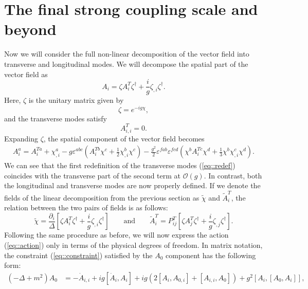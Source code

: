 \documentclass{article}
\begin{document}
\section{The final strong coupling scale and beyond}
Now we will consider the full non-linear decomposition of the vector field into transverse and longitudinal modes. We will decompose the spatial part of the vector field as 
\begin{equation}\label{eq::Nonlindec}
    A_i=\zeta A_i^T\zeta^{\dagger}+\frac{i}{g}\zeta_{,i}\zeta^{\dagger}.
\end{equation}
Here, $\zeta$ is the unitary matrix given by
\begin{equation}
    \zeta=e^{-ig\chi},
\end{equation}
and the transverse modes satisfy
\begin{equation}
    A_{i,i}^{T}=0.
\end{equation}
Expanding $\zeta$, the spatial component of the vector field becomes \begin{equation}\label{eq::Vainsh}
    \begin{split}
        A_i^a=A_i^{Ta}+\chi_{,i}^a-g\varepsilon^{abc}(A_i^{Tb}\chi^c+\frac{1}{2}\chi_{,i}^b\chi^c)-\frac{g^2}{2}\varepsilon^{fab}\varepsilon^{fcd}(\chi^bA_i^{Tc}\chi^d+\frac{1}{3}\chi^b\chi^c_{,i}\chi^d).
    \end{split}
\end{equation}
We can see that the first redefinition of the transverse modes (\ref{eq::redef}) coincides with the transverse part of the second term at $\mathcal{O}\left(g\right)$. In contrast, both the longitudinal and transverse modes are now properly defined. If we denote the fields of the linear decomposition from the previous section as $\tilde{\chi}$ and $\tilde{A}_i^T$, the relation between the two pairs of fields is as follows: 
\begin{equation}
    \tilde{\chi}=\frac{\partial_i}{\Delta}\left[\zeta A_i^T\zeta^{\dagger}+\frac{i}{g}\zeta_{,i}\zeta^{\dagger}\right]\qquad\text{and}\qquad \tilde{A}_i^T=P_{ij}^T\left[\zeta A_j^T\zeta^{\dagger}+\frac{i}{g}\zeta_{,j}\zeta^{\dagger}\right].
\end{equation}
Following the same procedure as before, we will now express the action (\ref{eq::action}) only in terms of the physical degrees of freedom. 
In matrix notation, the constraint (\ref{eq::constraint}) satisfied by the $A_0$ component has the following form: 
\begin{equation}\label{eq::constraint1}
    \begin{split}
        \left(-\Delta+m^2\right)A_0&=-\dot{A}_{i,i}+ig[\dot{A}_i,A_i]
        +ig\left(2\left[A_i,A_{0,i}\right]+\left[A_{i,i},A_0\right]\right)+g^2\left[A_i,\left[A_0,A_i\right]\right],
    \end{split}
\end{equation}
\end{document}
